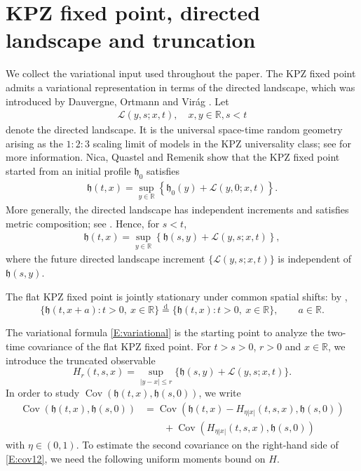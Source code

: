 \documentclass[12pt, reqno]{amsart}
\numberwithin{equation}{section}
\theoremstyle{definition}
\newcommand{\R}{\mathbb{R}}
\newcommand{\h}{\mathfrak{h}}
\newcommand{\Cov}{\operatorname{Cov}}
\newcommand{\Lcal}{\mathcal{L}}
\begin{document}
\section{KPZ fixed point, directed landscape and truncation}\label{S:inputs}

We collect the variational input used throughout the paper. The KPZ fixed point
admits a variational representation in terms of the directed landscape, which
was introduced by Dauvergne, Ortmann and Vir\'ag
\cite{dauvergne.ortmann.ea:22:directed}. Let 
\begin{align*}
  \Lcal(y,s; x, t), \quad x,y\in \R, s<t
\end{align*}
denote the directed landscape. It is the universal space-time random geometry
arising as the $1:2:3$ scaling limit of models in the KPZ universality class;
see \cite{dauvergne.ortmann.ea:22:directed} for more information.  Nica, Quastel
and Remenik \cite[Corollary~4.2]{nica.quastel.ea:20:one-sided*1} show that the KPZ fixed point
started from an initial profile $\h_0$ satisfies 
\begin{align} \label{E:var2}
  \h(t,x)=\sup_{y\in \R}\left\{\h_0(y) + \Lcal(y,0; x,t) \right\}.
\end{align}
More generally, the directed landscape has independent increments and satisfies
metric composition; see
\cite[Definition 10.1(II)--(III)]{dauvergne.ortmann.ea:22:directed}. Hence, for
$s<t$,
\begin{align}\label{E:variational}
          \h(t,x)=\sup_{y\in \R}\left\{\h(s, y) + \Lcal(y,s; x,t) \right\},
\end{align}
where the future directed landscape increment $\{\Lcal(y,s; x, t)\}$ is
independent of $\h(s,y)$.

The flat KPZ fixed point is jointly stationary under common spatial shifts:
by \cite[Theorem~4.5(iv)]{matetski.quastel.ea:21:kpz},
\begin{equation}\label{E:joint-spatial-stationarity}
  \{\h(t,x+a):t>0,\ x\in\R\}
  \overset{\mathrm d}=\{\h(t,x):t>0,\ x\in\R\},
  \qquad a\in\R.
\end{equation}


The variational formula \eqref{E:variational} is the starting point to analyze
the two-time covariance of the flat KPZ fixed point. For $t>s>0$, $r>0$ and
$x\in \R$, we introduce the truncated observable
\begin{equation}
  H_r(t,s,x)=\sup_{|y-x|\le r}\{\h(s,y)+\Lcal(y,s ;x,t )\}.
  \label{E:truncated}
\end{equation}
In order to study $\Cov(\h(t,x), \h(s,0))$, we write
\begin{align}\label{E:cov12}
\Cov(\h(t,x), \h(s,0)) &= \Cov(\h(t,x)- H_{\eta |x|}(t,s,x), \h(s,0)) \nonumber \\
&\quad \quad + \Cov(H_{\eta|x|}(t,s,x), \h(s,0))
\end{align}
with $\eta\in (0, 1)$. To estimate the second covariance on the right-hand side
of \eqref{E:cov12}, we need the following uniform moments bound on $H$. 
\end{document}
